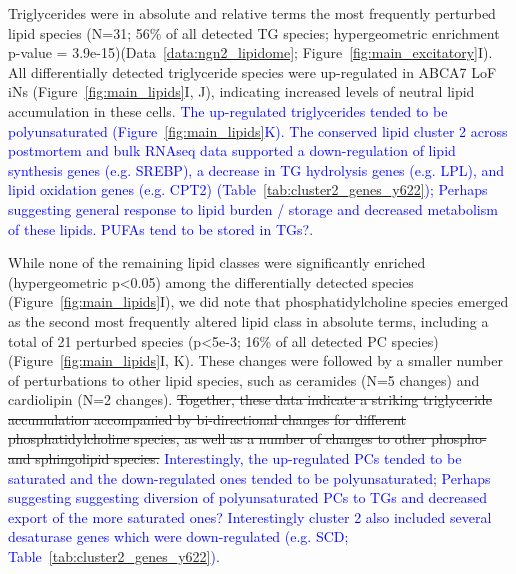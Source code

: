 Triglycerides were in absolute and relative terms the most frequently perturbed lipid species (N=31; 56\% of all detected TG species; hypergeometric enrichment p-value = 3.9e-15)(Data~\ref{data:ngn2_lipidome}; Figure~\ref{fig:main_excitatory}I). All differentially detected triglyceride species were up-regulated in ABCA7 LoF iNs (Figure~\ref{fig:main_lipids}I, J), indicating increased levels of neutral lipid accumulation in these cells. \textcolor{blue}{The up-regulated triglycerides tended to be polyunsaturated (Figure~\ref{fig:main_lipids}K). The conserved lipid cluster 2 across postmortem and bulk RNAseq data supported a down-regulation of lipid synthesis genes (e.g. SREBP), a decrease in TG hydrolysis genes (e.g. LPL), and lipid oxidation genes (e.g. CPT2) (Table~\ref{tab:cluster2_genes_y622}); Perhaps suggesting general response to lipid burden / storage and decreased metabolism of these lipids. PUFAs tend to be stored in TGs?}.

While none of the remaining lipid classes were significantly enriched (hypergeometric p<0.05) among the differentially detected species (Figure~\ref{fig:main_lipids}I), we did note that phosphatidylcholine species emerged as the second most frequently altered lipid class in absolute terms, including a total of 21 perturbed species (p<5e-3; 16\% of all detected PC species)(Figure~\ref{fig:main_lipids}I, K). These changes were followed by a smaller number of perturbations to other lipid species, such as ceramides (N=5 changes) and cardiolipin (N=2 changes). \sout{Together, these data indicate a striking triglyceride accumulation accompanied by bi-directional changes for different phosphatidylcholine species, as well as a number of changes to other phospho- and sphingolipid species.} \textcolor{blue}{Interestingly, the up-regulated PCs tended to be saturated and the down-regulated ones tended to be polyunsaturated; Perhaps suggesting suggesting diversion of polyunsaturated PCs to TGs and decreased export of the more saturated ones? Interestingly cluster 2 also included several desaturase genes which were down-regulated (e.g. SCD; Table~\ref{tab:cluster2_genes_y622}).}


